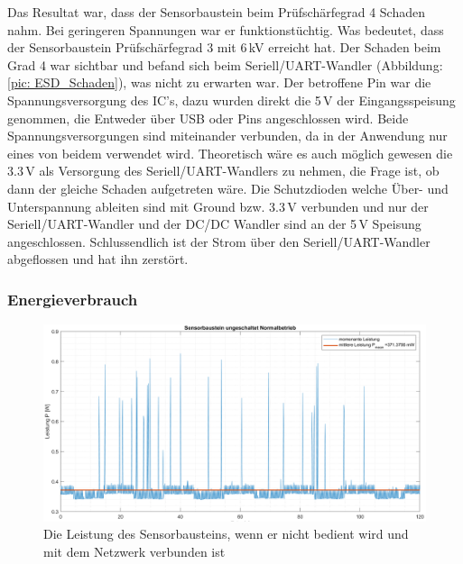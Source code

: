 Das Resultat war, dass der Sensorbaustein beim Prüfschärfegrad 4 Schaden nahm. Bei geringeren Spannungen war er funktionstüchtig. Was bedeutet, dass der Sensorbaustein Prüfschärfegrad 3 mit 6\,kV erreicht hat. Der Schaden beim Grad 4 war sichtbar und befand sich beim Seriell/UART-Wandler (Abbildung: \ref{pic: ESD_Schaden}), was nicht zu erwarten war. Der betroffene Pin war die Spannungsversorgung des IC's, dazu wurden direkt die 5\,V der Eingangsspeisung genommen, die Entweder über USB oder Pins angeschlossen wird. Beide Spannungsversorgungen sind miteinander verbunden, da in der Anwendung nur eines von beidem verwendet wird. Theoretisch wäre es auch möglich gewesen die 3.3\,V als Versorgung des Seriell/UART-Wandlers zu nehmen, die Frage ist, ob dann der gleiche Schaden aufgetreten wäre. Die Schutzdioden welche Über- und Unterspannung ableiten sind mit Ground bzw. 3.3\,V verbunden und nur der Seriell/UART-Wandler und der DC/DC Wandler sind an der 5\,V Speisung angeschlossen. Schlussendlich ist der Strom über den Seriell/UART-Wandler abgeflossen und hat ihn zerstört.

\subsubsection{Energieverbrauch}
\begin{figure}[H]
	\centering
	\includegraphics[width=1\textwidth]{graphics/Sensorbaustein_ungeschaltet.png}
	\caption{Die Leistung des Sensorbausteins, wenn er nicht bedient wird und mit dem Netzwerk verbunden ist}
	\label{pic: Sensorbaustein_ungeschaltet}
\end{figure}

